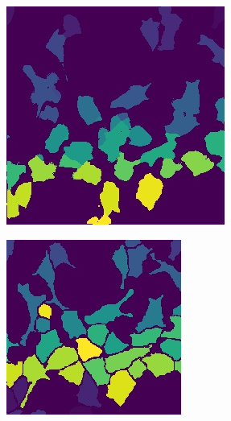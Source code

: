 \documentclass[10pt, journal, compsoc]{IEEEtran}
\begin{document}
\begin{figure}
\begin{subfigure}[b]{0.49\linewidth}
\includegraphics[width=\linewidth]{yolounetcrf/110115-yolounetcrf.jpg}
\caption{}
\end{subfigure}
\begin{subfigure}[b]{0.49\linewidth}
\includegraphics[width=\linewidth]{yolounetcrf/110115-label.jpg}

\end{subfigure}
\end{figure}
\end{document}
